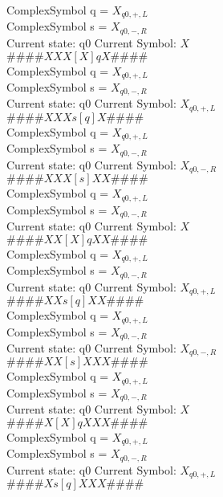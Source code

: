 \documentclass[10pt, a4paper]{article}
\begin{document}
ComplexSymbol q = $X_{q0,+,L}$ \\
ComplexSymbol s = $X_{q0,-,R}$ \\ 
 \medskip
Current state: q0	 Current Symbol: 	 $X$\\
$\# \#\# \# X X X [ X ] q X \# \# \# \# $ \\
ComplexSymbol q = $X_{q0,+,L}$ \\
ComplexSymbol s = $X_{q0,-,R}$ \\ 
 \medskip
Current state: q0	 Current Symbol: 	 $X_{q0,+,L}$\\
$\# \#\# \# X X X s [ q ] X \# \# \# \# $ \\
ComplexSymbol q = $X_{q0,+,L}$ \\
ComplexSymbol s = $X_{q0,-,R}$ \\ 
 \medskip
Current state: q0	 Current Symbol: 	 $X_{q0,-,R}$\\
$\# \#\# \# X X X [ s ] X X \# \# \# \# $ \\
ComplexSymbol q = $X_{q0,+,L}$ \\
ComplexSymbol s = $X_{q0,-,R}$ \\ 
 \medskip
Current state: q0	 Current Symbol: 	 $X$\\
$\# \#\# \# X X [ X ] q X X \# \# \# \# $ \\
ComplexSymbol q = $X_{q0,+,L}$ \\
ComplexSymbol s = $X_{q0,-,R}$ \\ 
 \medskip
Current state: q0	 Current Symbol: 	 $X_{q0,+,L}$\\
$\# \#\# \# X X s [ q ] X X \# \# \# \# $ \\
ComplexSymbol q = $X_{q0,+,L}$ \\
ComplexSymbol s = $X_{q0,-,R}$ \\ 
 \medskip
Current state: q0	 Current Symbol: 	 $X_{q0,-,R}$\\
$\# \#\# \# X X [ s ] X X X \# \# \# \# $ \\
ComplexSymbol q = $X_{q0,+,L}$ \\
ComplexSymbol s = $X_{q0,-,R}$ \\ 
 \medskip
Current state: q0	 Current Symbol: 	 $X$\\
$\# \#\# \# X [ X ] q X X X \# \# \# \# $ \\
ComplexSymbol q = $X_{q0,+,L}$ \\
ComplexSymbol s = $X_{q0,-,R}$ \\ 
 \medskip
Current state: q0	 Current Symbol: 	 $X_{q0,+,L}$\\
$\# \#\# \# X s [ q ] X X X \# \# \# \# $ \\
\end{document}
